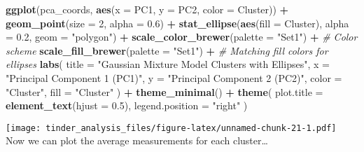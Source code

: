 \documentclass[
]{article}
\newenvironment{Shaded}{\begin{snugshade}}{\end{snugshade}}
\newcommand{\AttributeTok}[1]{\textcolor[rgb]{0.13,0.29,0.53}{#1}}
\newcommand{\CommentTok}[1]{\textcolor[rgb]{0.56,0.35,0.01}{\textit{#1}}}
\newcommand{\ConstantTok}[1]{\textcolor[rgb]{0.56,0.35,0.01}{#1}}
\newcommand{\DecValTok}[1]{\textcolor[rgb]{0.00,0.00,0.81}{#1}}
\newcommand{\FloatTok}[1]{\textcolor[rgb]{0.00,0.00,0.81}{#1}}
\newcommand{\FunctionTok}[1]{\textcolor[rgb]{0.13,0.29,0.53}{\textbf{#1}}}
\newcommand{\NormalTok}[1]{#1}
\newcommand{\OtherTok}[1]{\textcolor[rgb]{0.56,0.35,0.01}{#1}}
\newcommand{\SpecialCharTok}[1]{\textcolor[rgb]{0.81,0.36,0.00}{\textbf{#1}}}
\newcommand{\StringTok}[1]{\textcolor[rgb]{0.31,0.60,0.02}{#1}}
\begin{document}
\begin{Shaded}
\begin{Highlighting}[]
\FunctionTok{ggplot}\NormalTok{(pca\_coords, }\FunctionTok{aes}\NormalTok{(}\AttributeTok{x =}\NormalTok{ PC1, }\AttributeTok{y =}\NormalTok{ PC2, }\AttributeTok{color =}\NormalTok{ Cluster)) }\SpecialCharTok{+}
  \FunctionTok{geom\_point}\NormalTok{(}\AttributeTok{size =} \DecValTok{2}\NormalTok{, }\AttributeTok{alpha =} \FloatTok{0.6}\NormalTok{) }\SpecialCharTok{+}
  \FunctionTok{stat\_ellipse}\NormalTok{(}\FunctionTok{aes}\NormalTok{(}\AttributeTok{fill =}\NormalTok{ Cluster), }\AttributeTok{alpha =} \FloatTok{0.2}\NormalTok{, }\AttributeTok{geom =} \StringTok{"polygon"}\NormalTok{) }\SpecialCharTok{+}
  \FunctionTok{scale\_color\_brewer}\NormalTok{(}\AttributeTok{palette =} \StringTok{"Set1"}\NormalTok{) }\SpecialCharTok{+}  \CommentTok{\# Color scheme}
  \FunctionTok{scale\_fill\_brewer}\NormalTok{(}\AttributeTok{palette =} \StringTok{"Set1"}\NormalTok{) }\SpecialCharTok{+}   \CommentTok{\# Matching fill colors for ellipses}
  \FunctionTok{labs}\NormalTok{(}
    \AttributeTok{title =} \StringTok{"Gaussian Mixture Model Clusters with Ellipses"}\NormalTok{,}
    \AttributeTok{x =} \StringTok{"Principal Component 1 (PC1)"}\NormalTok{,}
    \AttributeTok{y =} \StringTok{"Principal Component 2 (PC2)"}\NormalTok{,}
    \AttributeTok{color =} \StringTok{"Cluster"}\NormalTok{,}
    \AttributeTok{fill =} \StringTok{"Cluster"}
\NormalTok{  ) }\SpecialCharTok{+}
  \FunctionTok{theme\_minimal}\NormalTok{() }\SpecialCharTok{+}
  \FunctionTok{theme}\NormalTok{(}
    \AttributeTok{plot.title =} \FunctionTok{element\_text}\NormalTok{(}\AttributeTok{hjust =} \FloatTok{0.5}\NormalTok{),}
    \AttributeTok{legend.position =} \StringTok{"right"}
\NormalTok{  )}
\end{Highlighting}
\end{Shaded}

\texttt{[image: tinder\_analysis\_files/figure-latex/unnamed-chunk-21-1.pdf]}
Now we can plot the average measurements for each cluster\ldots{}

\begin{Shaded}
\end{Shaded}
\end{document}
